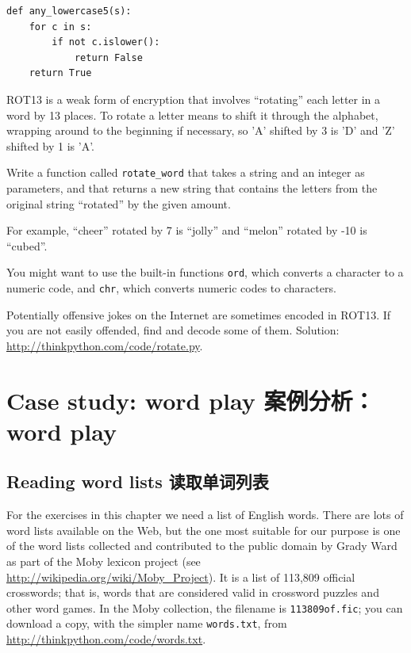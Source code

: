 \documentclass[10pt]{book}
\begin{document}
\begin{CJK}{UTF8}{gbsn}
\begin{exercise}
\begin{verbatim}
def any_lowercase5(s):
    for c in s:
        if not c.islower():
            return False
    return True
\end{verbatim}

\end{exercise}


\begin{exercise}

\label{exrotate}
ROT13 is a weak form of encryption that involves ``rotating'' each
letter in a word by 13 places.  To rotate a letter means
to shift it through the alphabet, wrapping around to the beginning if
necessary, so 'A' shifted by 3 is 'D' and 'Z' shifted by 1 is 'A'.

Write a function called \verb"rotate_word"
that takes a string and an integer as parameters, and that returns
a new string that contains the letters from the original string
``rotated'' by the given amount.  

For example, ``cheer'' rotated by 7 is ``jolly'' and ``melon'' rotated
by -10 is ``cubed''.  


You might want to use the built-in functions {\tt ord}, which converts
a character to a numeric code, and {\tt chr}, which converts numeric
codes to characters.

Potentially offensive jokes on the Internet are sometimes encoded
in ROT13.  If you are not easily offended, find and decode some
of them.  Solution: \url{http://thinkpython.com/code/rotate.py}.

\end{exercise}


\chapter{Case study: word play 案例分析：word play}

\section{Reading word lists 读取单词列表}
\label{wordlist}

For the exercises in this chapter we need a list of English words.
There are lots of word lists available on the Web, but the one most
suitable for our purpose is one of the word lists collected and
contributed to the public domain by Grady Ward as part of the Moby
lexicon project (see \url{http://wikipedia.org/wiki/Moby_Project}).  It
is a list of 113,809 official crosswords; that is, words that are
considered valid in crossword puzzles and other word games.  In the
Moby collection, the filename is {\tt 113809of.fic}; you can download
a copy, with the simpler name {\tt words.txt}, from
\url{http://thinkpython.com/code/words.txt}.


\end{CJK}
\end{document}
